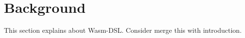 \section{Background}\label{sec:background}

This section explains about Wasm-DSL. Consider merge this with introduction.
